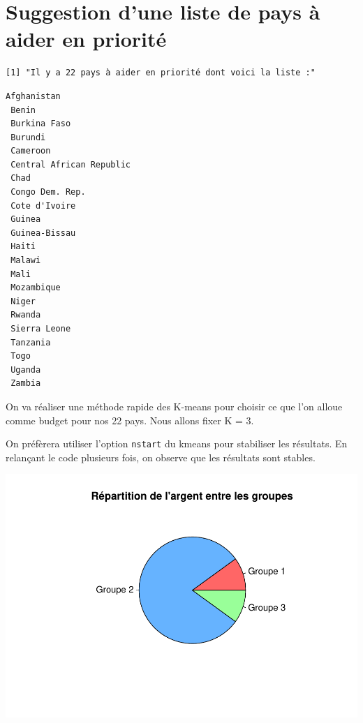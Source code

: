 \documentclass[
]{article}
\newenvironment{Shaded}{}{}
\newcommand{\AttributeTok}[1]{#1}
\newcommand{\DecValTok}[1]{#1}
\newcommand{\FunctionTok}[1]{#1}
\newcommand{\NormalTok}[1]{#1}
\newcommand{\OtherTok}[1]{\textcolor[rgb]{1.00,0.25,0.00}{#1}}
\newcommand{\SpecialCharTok}[1]{\textcolor[rgb]{0.00,0.50,0.50}{#1}}
\begin{document}
\hypertarget{suggestion-dune-liste-de-pays-uxe0-aider-en-priorituxe9}{%
\section{Suggestion d'une liste de pays à aider en
priorité}\label{suggestion-dune-liste-de-pays-uxe0-aider-en-priorituxe9}}

\begin{verbatim}
[1] "Il y a 22 pays à aider en priorité dont voici la liste :"
\end{verbatim}

\begin{verbatim}
Afghanistan 
 Benin 
 Burkina Faso 
 Burundi 
 Cameroon 
 Central African Republic 
 Chad 
 Congo Dem. Rep. 
 Cote d'Ivoire 
 Guinea 
 Guinea-Bissau 
 Haiti 
 Malawi 
 Mali 
 Mozambique 
 Niger 
 Rwanda 
 Sierra Leone 
 Tanzania 
 Togo 
 Uganda 
 Zambia 
\end{verbatim}

On va réaliser une méthode rapide des K-means pour choisir ce que l'on
alloue comme budget pour nos 22 pays. Nous allons fixer K = 3.

On préfèrera utiliser l'option \texttt{nstart} du kmeans pour stabiliser
les résultats. En relançant le code plusieurs fois, on observe que les
résultats sont stables.

\begin{Shaded}
\end{Shaded}

\includegraphics{Projet_files/figure-latex/unnamed-chunk-46-1.pdf}
\end{document}
